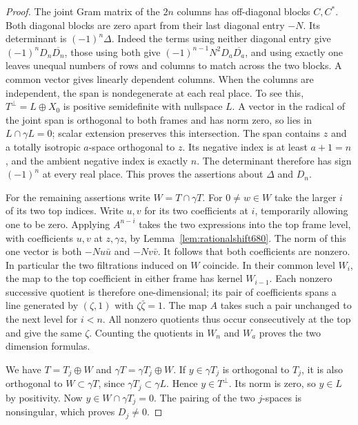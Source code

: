 \documentclass[a4paper,11pt]{article}
\theoremstyle{definition}
\theoremstyle{remark}
\numberwithin{equation}{section}
\begin{document}
\begin{proof}
The joint Gram matrix of the \(2n\) columns has off-diagonal
blocks \(C,C^*\). Both diagonal blocks are zero apart from their
last diagonal entry \(-N\). Its determinant is
\((-1)^n\Delta\). Indeed the terms using neither diagonal entry
give \((-1)^nD_n\overline{D_n}\), those using both give
\((-1)^{n-1}N^2 D_a\overline{D_a}\), and using exactly one leaves
unequal numbers of rows and columns to match across the two
blocks. A common vector gives linearly dependent columns. When
the columns are independent, the span is nondegenerate at each
real place. To see this, \(T^\perp=L\oplus X_0\) is positive
semidefinite with nullspace \(L\). A vector in the radical of
the joint span is orthogonal to both frames and has norm zero,
so lies in \(L\cap\gamma L=0\); scalar extension preserves this
intersection. The span contains \(z\) and a totally isotropic
\(a\)-space orthogonal to \(z\). Its negative index is at least
\(a+1=n\), and the ambient negative index is exactly \(n\).
The determinant therefore has sign \((-1)^n\) at every real
place. This proves the assertions about \(\Delta\) and \(D_n\).

For the remaining assertions write \(W=T\cap\gamma T\).
For \(0\ne w\in W\) take the larger \(i\) of its two top
indices. Write \(u,v\) for its two coefficients at \(i\),
temporarily allowing one to be zero. Applying \(A^{n-i}\)
takes the two expressions into the top frame level, with
coefficients \(u,v\) at \(z,\gamma z\), by
Lemma~\ref{lem:rationalshift680}. The norm of this one vector
is both \(-N u\bar u\) and \(-N v\bar v\).
It follows that both coefficients are nonzero. In particular
the two filtrations induced on \(W\) coincide. In their common
level \(W_i\), the map to the top coefficient in either frame
has kernel \(W_{i-1}\). Each nonzero successive quotient is
therefore one-dimensional; its pair of coefficients spans a
line generated by \((\zeta,1)\) with \(\zeta\bar\zeta=1\).
The map \(A\) takes such a pair unchanged to the next level
for \(i<n\). All nonzero quotients thus occur consecutively at
the top and give the same \(\zeta\). Counting the quotients in
\(W_n\) and \(W_a\) proves the two dimension formulas.

We have \(T=T_j\oplus W\) and \(\gamma T=\gamma T_j\oplus W\).
If \(y\in\gamma T_j\) is orthogonal to \(T_j\), it is also
orthogonal to \(W\subset\gamma T\), since
\(\gamma T_j\subset\gamma L\). Hence \(y\in T^\perp\). Its norm
is zero, so \(y\in L\) by positivity. Now
\(y\in W\cap\gamma T_j=0\). The pairing of the two \(j\)-spaces
is nonsingular, which proves \(D_j\ne0\).
\end{proof}
\end{document}
